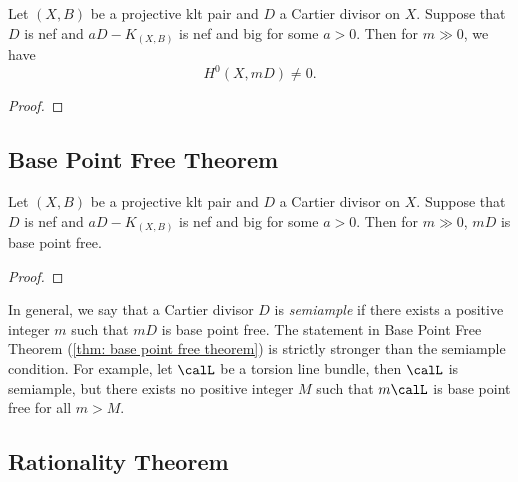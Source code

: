    \begin{theorem}\label{thm: non-vanishing theorem}
        Let \((X,B)\) be a projective klt pair and \(D\) a Cartier divisor on \(X\).
        Suppose that \(D\) is nef and \(aD-K_{(X,B)}\) is nef and big for some \(a > 0\).
        Then for \(m \gg 0\), we have
        \[ H^0(X,mD) \neq 0. \]
    \end{theorem}
    \begin{proof}
    \end{proof}

\subsection{Base Point Free Theorem}

    \begin{theorem}\label{thm: base point free theorem}
        Let \((X,B)\) be a projective klt pair and \(D\) a Cartier divisor on \(X\).
        Suppose that \(D\) is nef and \(aD-K_{(X,B)}\) is nef and big for some \(a > 0\).
        Then for \(m \gg 0\), \(mD\) is base point free.
    \end{theorem}
    \begin{proof}
    \end{proof}

    \begin{remark}\label{rmk:statement_in_BPF_theorem_stronger_than_semiample}
        In general, we say that a Cartier divisor \(D\) is \emph{semiample} if there exists a positive integer \(m\) such that \(mD\) is base point free.
        The statement in Base Point Free Theorem (\cref{thm: base point free theorem}) is strictly stronger than the semiample condition.
        For example, let \(\calL\) be a torsion line bundle, then \(\calL\) is semiample, but there exists no positive integer \(M\) such that \(m\calL\) is base point free for all \(m>M\).
    \end{remark}

\subsection{Rationality Theorem}




